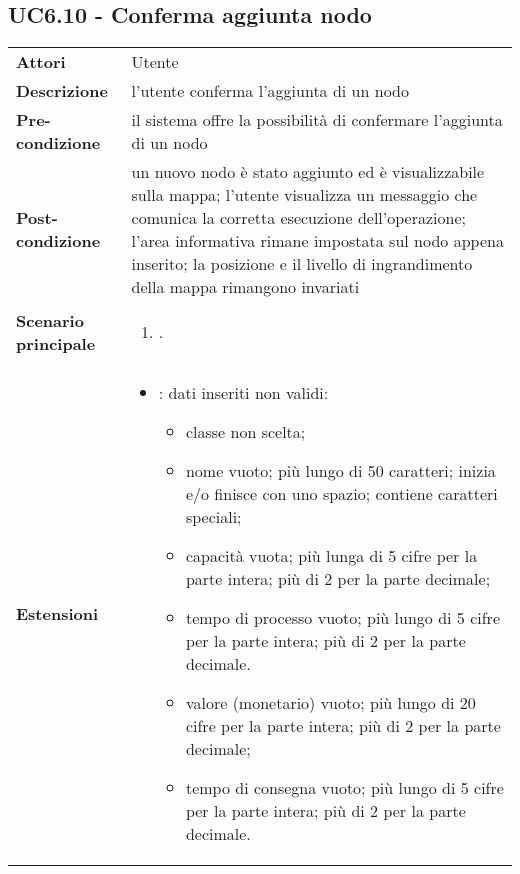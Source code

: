 \subsection{UC6.10 - Conferma aggiunta nodo} 
\label{sssec:UC6.10} 
\def\arraystretch{1.5}
\begin{tabularx}{\textwidth}{l|p{}}
	\rowcolor{I} \multicolumn{2}{c}{\color{white}\textbf{UC6.10 - Conferma aggiunta nodo}} \\
	\toprule
	\endhead
	\textbf{Attori} & Utente\\
	\textbf{Descrizione} & l'utente conferma l'aggiunta di un nodo\\
	\textbf{Pre-condizione} & il sistema offre la possibilità di confermare l'aggiunta di un nodo\\
	\textbf{Post-condizione} & un nuovo nodo è stato aggiunto ed è visualizzabile sulla mappa; l'utente visualizza un messaggio che comunica la corretta esecuzione dell'operazione; l'area informativa rimane impostata sul nodo appena inserito; la posizione e il livello di ingrandimento della mappa rimangono invariati\\
	\textbf{Scenario principale} & \vspace{-1.2em}\begin{enumerate}[leftmargin=*,noitemsep,nosep]
		\item \nameref{sssec:UC6.10}.
	\end{enumerate}\\
	\textbf{Estensioni} & \vspace{-1.2em}\begin{itemize}[leftmargin=*,noitemsep,nosep]
		\item \nameref{sssec:UC6.11}: dati inseriti non validi:
		\begin{itemize}
			\item classe non scelta;
			\item nome vuoto; più lungo di 50 caratteri; inizia e/o finisce con uno spazio; contiene caratteri speciali;
			\item capacità vuota; più lunga di 5
			cifre per la parte intera; più di 2 per la parte decimale;
			\item tempo di processo vuoto; più lungo di 5 cifre per la parte intera; più di 2 per la parte decimale.
			\item valore (monetario) vuoto; più lungo di 20 cifre per la parte intera; più di 2 per la parte decimale;
			\item tempo di consegna vuoto; più lungo di 5 cifre per la parte intera; più di 2 per la parte decimale.
		\end{itemize}
	\end{itemize}\\
	\bottomrule
\end{tabularx}
